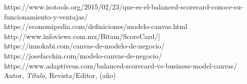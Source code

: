 \begin{thebibliography}{99}
https://www.isotools.org/2015/02/23/que-es-el-balanced-scorecard-conoce-su-funcionamiento-y-ventajas/\\
https://economipedia.com/definiciones/modelo-canvas.html\\
http://www.infoviews.com.mx/Bitam/ScoreCard/]\\
https://innokabi.com/canvas-de-modelo-de-negocio/\\
https://josefacchin.com/modelo-canvas-de-negocio/\\
https://www.adaptiveus.com/balanced-scorecard-vs-business-model-canvas/\\

 Autor, \emph{Título}, Revista/Editor, (año)

\end{thebibliography}



